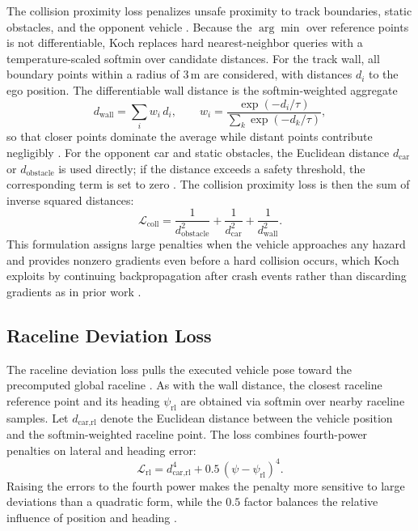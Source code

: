 The collision proximity loss penalizes unsafe proximity to track boundaries, static obstacles, and the opponent vehicle \cite{koch_DifferentiableInterpretablePath_2025}.
Because the $\arg\min$ over reference points is not differentiable, Koch replaces hard nearest-neighbor queries with a temperature-scaled softmin over candidate distances.
For the track wall, all boundary points within a radius of $3\,\mathrm{m}$ are considered, with distances $d_i$ to the ego position.
The differentiable wall distance is the softmin-weighted aggregate
\begin{equation}
    d_{\text{wall}} = \sum_i w_i\, d_i, \qquad w_i = \frac{\exp(-d_i / \tau)}{\sum_k \exp(-d_k / \tau)},
    \label{eq:DiffPlanSoftminWall}
\end{equation}
so that closer points dominate the average while distant points contribute negligibly \cite{koch_DifferentiableInterpretablePath_2025}.
For the opponent car and static obstacles, the Euclidean distance $d_{\text{car}}$ or $d_{\text{obstacle}}$ is used directly; if the distance exceeds a safety threshold, the corresponding term is set to zero \cite{koch_DifferentiableInterpretablePath_2025}.
The collision proximity loss is then the sum of inverse squared distances:
\begin{equation}
    \mathcal{L}_{\text{coll}} = \frac{1}{d_{\text{obstacle}}^{2}} + \frac{1}{d_{\text{car}}^{2}} + \frac{1}{d_{\text{wall}}^{2}}.
    \label{eq:DiffPlanCollLoss}
\end{equation}
This formulation assigns large penalties when the vehicle approaches any hazard and provides nonzero gradients even before a hard collision occurs, which Koch exploits by continuing backpropagation after crash events rather than discarding gradients as in prior work \cite{koch_DifferentiableInterpretablePath_2025, swadiryus_DifferentiableMotionPlanning_2025}.

\subsection{Raceline Deviation Loss}

The raceline deviation loss pulls the executed vehicle pose toward the precomputed global raceline \cite{koch_DifferentiableInterpretablePath_2025}.
As with the wall distance, the closest raceline reference point and its heading $\psi_{\text{rl}}$ are obtained via softmin over nearby raceline samples.
Let $d_{\text{car,rl}}$ denote the Euclidean distance between the vehicle position and the softmin-weighted raceline point.
The loss combines fourth-power penalties on lateral and heading error:
\begin{equation}
    \mathcal{L}_{\text{rl}} = d_{\text{car,rl}}^{4} + 0.5\,(\psi - \psi_{\text{rl}})^{4}.
    \label{eq:DiffPlanRlLoss}
\end{equation}
Raising the errors to the fourth power makes the penalty more sensitive to large deviations than a quadratic form, while the $0.5$ factor balances the relative influence of position and heading \cite{koch_DifferentiableInterpretablePath_2025}.
